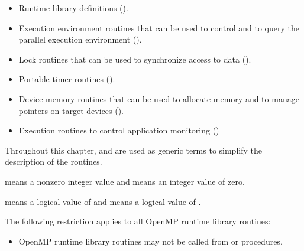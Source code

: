 \begin{itemize}
\item Runtime library definitions 
      ().
\item Execution environment routines that can be used to control 
      and to query the parallel execution environment
      ().
\item Lock routines that can be used to synchronize access to 
      data ().
\item Portable timer routines
      ().
\item Device memory routines that can be used to allocate memory 
      and to manage pointers on target devices 
      ().
\item Execution routines to control application monitoring
      ()
\end{itemize}

Throughout this chapter,  and  are used as 
generic terms to simplify the description of the routines.

\begin{samepage}
\begin{ccppspecific}
 means a nonzero integer value and  means 
an integer value of zero.
\end{ccppspecific}
\end{samepage}
\bigskip

\begin{samepage}
\begin{fortranspecific}
 means a logical value of  and  
means a logical value of .
\end{fortranspecific}
\end{samepage}
\bigskip

\begin{samepage}

\begin{fortranspecific}

\restrictions
The following restriction applies to all OpenMP runtime library routines:

\begin{itemize}
\item OpenMP runtime library routines may not be called 
      from  or  procedures.
\end{itemize}
\end{fortranspecific}
\end{samepage}



